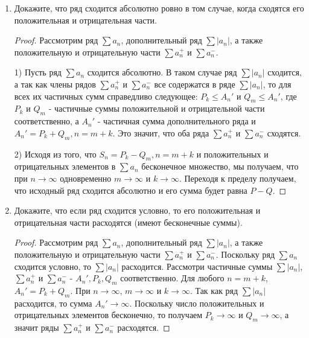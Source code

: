 \documentclass[a4paper]{article}
\begin{document}
\begin{enumerate}
   		\item Докажите, что ряд сходится абсолютно ровно в том случае, когда сходятся его положительная и отрицательная части.
   			
   		\begin{proof}
   		
   			Рассмотрим ряд $\sum a_n$, дополнительный ряд $\sum |a_n|$, а также положительную и отрицательную части $\sum a_n^+$ и $\sum a_n^-$.
   			
   			1) Пусть ряд $\sum a_n$ сходится абсолютно. В таком случае ряд $\sum |a_n|$ сходится, а так как члены рядов $\sum a_n^+$ и $\sum a_n^-$ все содержатся в ряде $\sum |a_n|$, то для всех их частичных сумм справедливо следующее: $P_k \leqslant A_n'$ и $Q_m \leqslant A_n'$, где $P_k$ и $Q_m$ - частичные суммы положительной и отрицательной части соответственно, а $A_n'$ - частичная сумма дополнительного ряда и $A_n' = P_k + Q_m, n = m + k$. Это значит, что оба ряда $\sum a_n^+$ и $\sum a_n^-$ сходятся.
   			
   			2) Исходя из того, что $S_n = P_k - Q_m, n = m + k$ и положительных и отрицательных элементов в $\sum a_n$ бесконечное множество, мы получаем, что при $n \rightarrow \infty$ одновременно $m \rightarrow \infty$ и $k \rightarrow \infty$. Переходя к пределу получаем, что исходный ряд сходится абсолютно и его сумма будет равна $P - Q$.
   			
   			
   		\end{proof}
   	
   		\item Докажите, что если ряд сходится условно, то его положительная и отрицательная части расходятся (имеют бесконечные суммы).
   		
   		\begin{proof}
   			Рассмотрим ряд $\sum a_n$, дополнительный ряд $\sum |a_n|$, а также положительную и отрицательную части $\sum a_n^+$ и $\sum a_n^-$. Поскольку ряд $\sum a_n$ сходится условно, то $\sum |a_n|$ расходится. Рассмотри частичные суммы $\sum |a_n|$, $\sum a_n^+$ и $\sum a_n^-$ - $A_n', P_k, Q_m$ соответственно. Для любого $n = m + k$, $A_n' = P_k + Q_m$. При $n \rightarrow \infty$, $m \rightarrow \infty$ и $k \rightarrow \infty$. Так как ряд $\sum |a_n|$ расходится, то сумма $A_n' \rightarrow \infty$. Поскольку число положительных и отрицательных элементов бесконечно, то получаем $P_k \rightarrow \infty$ и $Q_m \rightarrow \infty$, а значит ряды $\sum a_n^+$ и $\sum a_n^-$ расходятся.
   		\end{proof}
           

\end{enumerate}
\end{document}
